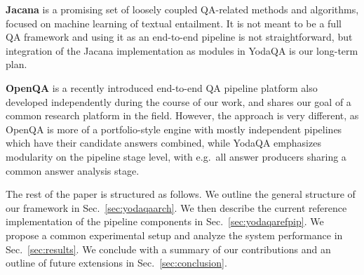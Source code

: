 \documentclass{poster15}
\begin{document}
\textbf{Jacana} \cite{TreeEdit2013Yao} \cite{TreeEditIR2013Yao}
is a promising set of loosely coupled QA-related methods
and algorithms, focused on machine learning of textual entailment.  It is
not meant to be a full QA framework and using it as an end-to-end pipeline
is not straightforward, but integration of the Jacana implementation as
modules in YodaQA is our long-term plan.

\textbf{OpenQA} \cite{OpenQA} is a recently introduced end-to-end QA pipeline platform
also developed independently during the course of our work, and shares our
goal of a common research platform in the field.  However, the approach
is very different, as OpenQA is more of a portfolio-style engine with
mostly independent pipelines which have their candidate answers combined,
while YodaQA emphasizes modularity on the pipeline stage level,
with e.g.\ all answer producers sharing a common answer analysis stage.

The rest of the paper is structured as follows.  We outline the general structure
of our framework in Sec.~\ref{sec:yodaqaarch}.  We then
describe the current reference implementation of the pipeline components
in Sec.~\ref{sec:yodaqarefpip}.  We propose a common experimental setup
and analyze the system performance in Sec.~\ref{sec:results}.
We conclude with a summary of our contributions
and an outline of future extensions in Sec.~\ref{sec:conclusion}.

\begin{figure}[ht]
\begin{center}
\label{fig:arch}
\end{center}
\end{figure}%
\end{document}
